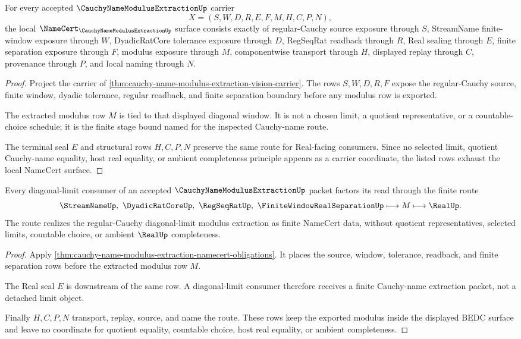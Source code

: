 \begin{theorem}
\label{thm:cauchy-name-modulus-extraction-namecert-obligations}
For every accepted $\CauchyNameModulusExtractionUp$ carrier
$$
X=(S,W,D,R,E,F,M,H,C,P,N),
$$
the local $\NameCert_{\CauchyNameModulusExtractionUp}$ surface consists exactly of regular-Cauchy source exposure through $S$, StreamName finite-window exposure through $W$, DyadicRatCore tolerance exposure through $D$, RegSeqRat readback through $R$, Real sealing through $E$, finite separation exposure through $F$, modulus exposure through $M$, componentwise transport through $H$, displayed replay through $C$, provenance through $P$, and local naming through $N$.
\end{theorem}
\begin{proof}
Project the carrier of \autoref{thm:cauchy-name-modulus-extraction-vision-carrier}. The rows $S,W,D,R,F$ expose the regular-Cauchy source, finite window, dyadic tolerance, regular readback, and finite separation boundary before any modulus row is exported.

The extracted modulus row $M$ is tied to that displayed diagonal window. It is not a chosen limit, a quotient representative, or a countable-choice schedule; it is the finite stage bound named for the inspected Cauchy-name route.

The terminal seal $E$ and structural rows $H,C,P,N$ preserve the same route for Real-facing consumers. Since no selected limit, quotient Cauchy-name equality, host real equality, or ambient completeness principle appears as a carrier coordinate, the listed rows exhaust the local NameCert surface.
\end{proof}

\begin{theorem}
\label{thm:cauchy-name-modulus-extraction-diagonal-route}
Every diagonal-limit consumer of an accepted $\CauchyNameModulusExtractionUp$ packet factors its read through the finite route
$$
\StreamNameUp,\ \DyadicRatCoreUp,\ \RegSeqRatUp,\ \FiniteWindowRealSeparationUp
\longmapsto
M
\longmapsto
\RealUp .
$$
The route realizes the regular-Cauchy diagonal-limit modulus extraction as finite NameCert data, without quotient representatives, selected limits, countable choice, or ambient $\RealUp$ completeness.
\end{theorem}
\begin{proof}
Apply \autoref{thm:cauchy-name-modulus-extraction-namecert-obligations}. It places the source, window, tolerance, readback, and finite separation rows before the extracted modulus row $M$.

The Real seal $E$ is downstream of the same row. A diagonal-limit consumer therefore receives a finite Cauchy-name extraction packet, not a detached limit object.

Finally $H,C,P,N$ transport, replay, source, and name the route. These rows keep the exported modulus inside the displayed BEDC surface and leave no coordinate for quotient equality, countable choice, host real equality, or ambient completeness.
\end{proof}

